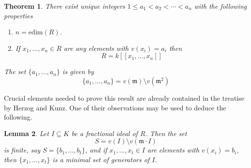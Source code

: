 \documentclass[12pt]{amsart}
\theoremstyle{plain}%
\newtheorem{satz}{Theorem}[section]
\newtheorem{lemma}[satz]{Lemma}
\theoremstyle{definition}
\renewcommand{\(}{\left(}
\renewcommand{\)}{\right)}
\renewcommand{\leq}{\leqslant}
\begin{document}
\begin{satz}\label{thm:exist_unique}
There exist unique integers $1 \leq a_1 < a_2 < \cdots 
< a_n$ with the following properties
\begin{enumerate}
\item $n = \mathrm{edim}(R)$. 
\item If $x_1, \ldots, x_n \in R$ are any elements with 
$v(x_i) = a_i$ then 
	$$ R = k[[x_1, \ldots, x_n]] $$
\end{enumerate}
The set $\{a_1, \ldots, a_n\}$ is given by 
	$$ \{a_1, \ldots, a_n\} = v(\mathfrak m) \setminus 
    v(\mathfrak m^2) $$
\end{satz}

Crucial elements needed to prove this result are already 
contained in the treatise~\cite{HK} by Herzog and Kunz. 
One of their observations may be used to deduce the following.

\begin{lemma}\label{lem:frac_ideal_HK}
Let $I \subseteq K$ be a fractional ideal of $R$. Then the 
set 
	$$ S = v(I) \setminus v(\mathfrak m \cdot I) $$ 
is finite, say $S = \{b_1, \ldots, b_t\}$, and if 
$x_1, \ldots , x_t \in I$ are elements with $v(x_i)=b_i$, 
then $\{x_1, \ldots, x_t\}$ is a minimal set of generators 
of $I$.
\end{lemma}
\end{document}
